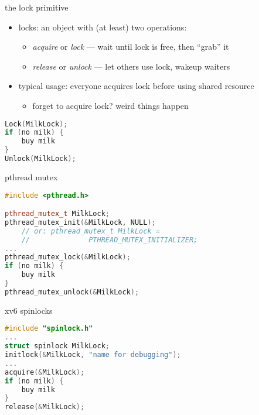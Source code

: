 \begin{frame}[fragile,label=lockDefn]{the lock primitive}
    \begin{itemize}
    \item locks: an object with (at least) two operations:
        \begin{itemize}
        \item \textit{acquire} or \textit{lock} --- wait until lock is free, then ``grab'' it
        \item \textit{release} or \textit{unlock} --- let others use lock, wakeup waiters
        \end{itemize}
    \item typical usage: everyone acquires lock before using shared resource
        \begin{itemize}
        \item forget to acquire lock? weird things happen
        \end{itemize}
    \end{itemize}
\begin{lstlisting}[language=C++,style=small]
Lock(MilkLock);
if (no milk) {
    buy milk
}
Unlock(MilkLock);
\end{lstlisting}
\end{frame}

\begin{frame}[fragile,label=pthreadMutex]{pthread mutex}
\begin{lstlisting}[language=C++,style=small]
#include <pthread.h>

pthread_mutex_t MilkLock;
pthread_mutex_init(&MilkLock, NULL);
    // or: pthread_mutex_t MilkLock =
    //              PTHREAD_MUTEX_INITIALIZER;
...
pthread_mutex_lock(&MilkLock);
if (no milk) {
    buy milk
}
pthread_mutex_unlock(&MilkLock);
\end{lstlisting}
\end{frame}

\begin{frame}[fragile,label=xv6SpinlockUsage]{xv6 spinlocks}
\begin{lstlisting}[language=C++,style=small]
#include "spinlock.h"
...
struct spinlock MilkLock;
initlock(&MilkLock, "name for debugging");
...
acquire(&MilkLock);
if (no milk) {
    buy milk
}
release(&MilkLock);
\end{lstlisting}
\end{frame}
